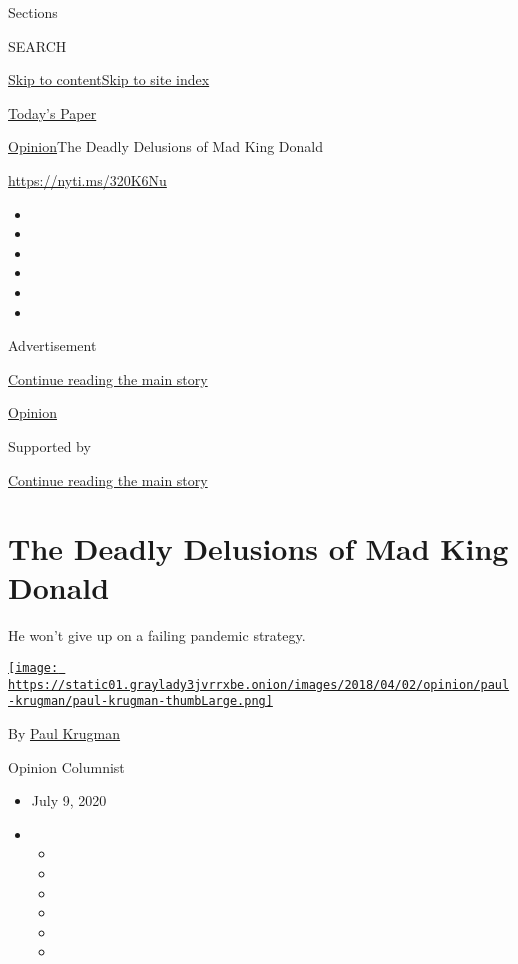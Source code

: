 Sections

SEARCH

\protect\hyperlink{site-content}{Skip to
content}\protect\hyperlink{site-index}{Skip to site index}

\href{https://myaccount.nytimes3xbfgragh.onion/auth/login?response_type=cookie\&client_id=vi}{}

\href{https://www.nytimes3xbfgragh.onion/section/todayspaper}{Today's
Paper}

\href{/section/opinion}{Opinion}\textbar{}The Deadly Delusions of Mad
King Donald

\href{https://nyti.ms/320K6Nu}{https://nyti.ms/320K6Nu}

\begin{itemize}
\item
\item
\item
\item
\item
\item
\end{itemize}

Advertisement

\protect\hyperlink{after-top}{Continue reading the main story}

\href{/section/opinion}{Opinion}

Supported by

\protect\hyperlink{after-sponsor}{Continue reading the main story}

\hypertarget{the-deadly-delusions-of-mad-king-donald}{%
\section{The Deadly Delusions of Mad King
Donald}\label{the-deadly-delusions-of-mad-king-donald}}

He won't give up on a failing pandemic strategy.

\href{https://www.nytimes3xbfgragh.onion/by/paul-krugman}{\texttt{[image: https://static01.graylady3jvrrxbe.onion/images/2018/04/02/opinion/paul-krugman/paul-krugman-thumbLarge.png]}}

By \href{https://www.nytimes3xbfgragh.onion/by/paul-krugman}{Paul
Krugman}

Opinion Columnist

\begin{itemize}
\item
  July 9, 2020
\item
  \begin{itemize}
  \item
  \item
  \item
  \item
  \item
  \item
  \end{itemize}
\end{itemize}

